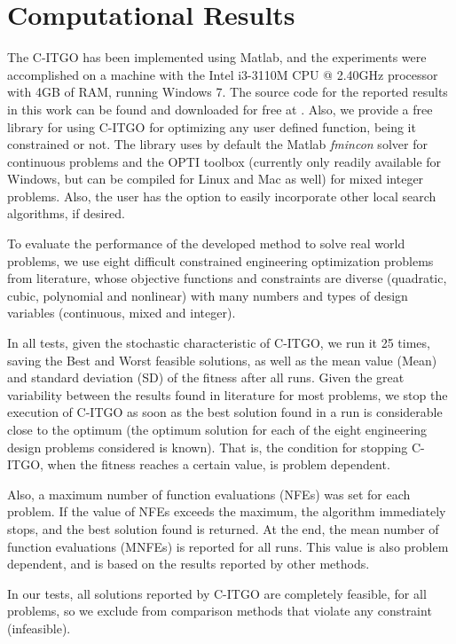 \section{Computational Results} \label{sec:Results}

The C-ITGO has been implemented using Matlab, and the experiments were accomplished on a machine with the Intel i3-3110M CPU @ 2.40GHz processor with 4GB of RAM, running Windows 7. The source code for the reported results in this work can be found and downloaded for free at \cite{GIT}. Also, we provide a free library for using C-ITGO for optimizing any user defined function, being it constrained or not. The library uses by default the Matlab \textit{fmincon} solver for continuous problems and the OPTI toolbox (currently only readily available for Windows, but can be compiled for Linux and Mac as well) for mixed integer problems. Also, the user has the option to easily incorporate other local search algorithms, if desired.

To evaluate the performance of the developed method to solve real world problems, we use eight difficult constrained engineering optimization problems from literature, whose objective functions and constraints are diverse (quadratic, cubic, polynomial and nonlinear) with many numbers and types of design variables (continuous, mixed and integer). 

In all tests, given the stochastic characteristic of C-ITGO, we run it 25 times, saving the Best and Worst feasible solutions, as well as the mean value (Mean) and standard deviation (SD) of the fitness after all runs. Given the great variability between the results found in literature for most problems, we stop the execution of C-ITGO as soon as the best solution found in a run is considerable close to the optimum (the optimum solution for each of the eight engineering design problems considered is known). That is, the condition for stopping C-ITGO, when the fitness reaches a certain value, is problem dependent.

Also, a maximum number of function evaluations (NFEs) was set for each problem. If the value of NFEs exceeds the maximum, the algorithm immediately stops, and the best solution found is returned. At the end, the mean number of function evaluations (MNFEs) is reported for all runs. This value is also problem dependent, and is based on the results reported by other methods.

In our tests, all solutions reported by C-ITGO are completely feasible, for all problems, so we exclude from comparison methods that violate any constraint (infeasible).

